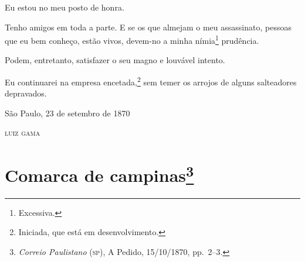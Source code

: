 Eu estou no meu posto de honra.

Tenho amigos em toda a parte. E se os que almejam o meu assassinato,
pessoas que eu bem conheço, estão vivos, devem-no a minha
nímia\footnote{ Excessiva.} prudência.

Podem, entretanto, satisfazer o seu magno e louvável intento.

Eu continuarei na empresa encetada,\footnote{ Iniciada, que está em
  desenvolvimento.} sem temer os arrojos de alguns salteadores
depravados.

\begin{flushright}
São Paulo, 23 de setembro de 1870

\textsc{luiz gama}
\end{flushright}

\chapter{Comarca de campinas\footnote{\emph{Correio Paulistano} (\textsc{sp}), A Pedido, 15/10/1870,
  pp.~2--3.}} %

